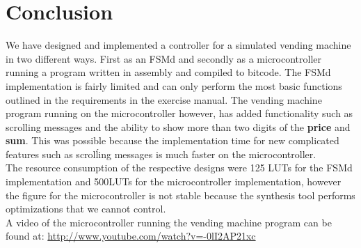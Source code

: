 \section{Conclusion}
We have designed and implemented a controller for a simulated vending machine in two different ways. First as
an FSMd and secondly as a microcontroller running a program written in assembly and compiled to bitcode. 
The FSMd implementation is fairly limited and can only perform the most basic functions outlined in the
requirements in the exercise manual. The vending machine program running on the microcontroller however, has 
added functionality such as scrolling messages and the ability to show more than two digits of the 
\textbf{price} and \textbf{sum}. This was possible because the implementation time for new complicated features such as scrolĺing messages is much faster on the microcontroller. \\

The resource consumption of the respective designs were 125 LUTs for the FSMd implementation and 500LUTs for the microcontroller implementation, however the figure for the microcontroller is not stable
because the synthesis tool performs optimizations that we cannot control. \\

A video of the microcontroller running the vending machine program can be found at:
\url{http://www.youtube.com/watch?v=-0lI2AP21xc}

